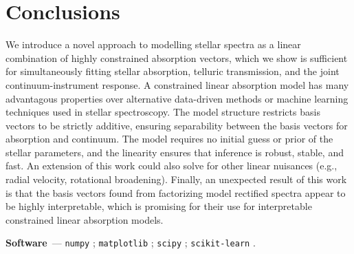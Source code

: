 \documentclass[modern]{aastex631}
\renewcommand{\paragraph}[1]{\medskip\par\noindent\textbf{#1}~---}
\begin{document}
\section{Conclusions} \label{sec:conclusions}

We introduce a novel approach to modelling stellar spectra as a linear combination of highly constrained absorption vectors, which we show is sufficient for simultaneously fitting stellar absorption, telluric transmission, and the joint continuum-instrument response. A constrained linear absorption model has many advantagous properties over alternative data-driven methods or machine learning techniques used in stellar spectroscopy. The model structure restricts basis vectors to be strictly additive, ensuring separability between the basis vectors for absorption and continuum. The model requires no initial guess or prior of the stellar parameters, and the linearity ensures that inference is robust, stable, and fast. An extension of this work could also solve for other linear nuisances (e.g., radial velocity, rotational broadening). Finally, an unexpected result of this work is that the basis vectors found from factorizing model rectified spectra appear to be highly interpretable, which is promising for their use for interpretable constrained linear absorption models.\\





\paragraph{Software}
\texttt{numpy} \citep{numpy}; 
\texttt{matplotlib} \citep{matplotlib}; 
\texttt{scipy} \citep{scipy};
\texttt{scikit-learn} \citep{scikit_learn}.
\end{document}
